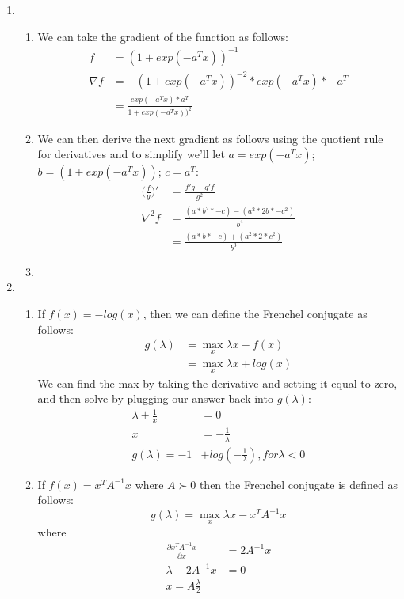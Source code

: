 \documentclass[11pt,a4paper]{article}
\begin{document}
\begin{enumerate}
			\item
			\begin{enumerate}
				\item We can take the gradient of the function as follows:
				\begin{align*}
				f &= (1+exp(-a^Tx))^{-1} \\
				\nabla f &= -(1+exp(-a^Tx))^{-2} * exp(-a^Tx) * -a^T \\
						 &= \frac{exp(-a^Tx) * a^T}{1+exp(-a^Tx))^{2}}
				\end{align*}
				\item We can then derive the next gradient as follows using the quotient rule for derivatives and to simplify we'll let $a = exp(-a^Tx)$; $b=(1+exp(-a^Tx))$; $c = a^T$:
				\begin{align*}
				\Big(\frac{f}{g}\Big)' &= \frac{f'g - g'f}{g^2} \\
				\nabla^2 f &= \frac{(a * b^2 * -c) - (a^2 * 2b * -c^2)}{b^4} \\
				&= \frac{(a * b * -c) + (a^2 * 2 * c^2)}{b^3}
				\end{align*}
				\item 
			\end{enumerate}
			\item
			\begin{enumerate}
				\item If $f(x)=-log(x)$, then we can define the Frenchel conjugate as follows:
				\begin{align*}
				g(\lambda) &= \max_x \lambda x - f(x) \\
				&= \max_x \lambda x + log(x)
				\end{align*}
				We can find the max by taking the derivative and setting it equal to zero, and then solve by plugging our answer back into $g(\lambda)$:
				\begin{align*}
					\lambda+\frac{1}{x} &= 0 \\
					x &= -\frac{1}{\lambda} \\
					g(\lambda) = -1 &+ log(-\frac{1}{\lambda}), for \lambda<0
				\end{align*}
				
				\item If $f(x) = x^T A^{-1}x$ where $A \succ 0$ then the Frenchel conjugate is defined as follows:
				$$g(\lambda) = \max_x \lambda x - x^T A^{-1}x$$ where
				\begin{align*}
				\frac{\partial x^T A^{-1}x}{\partial x} &= 2A^{-1}x \\
				\lambda - 2A^{-1}x &= 0 \\
				x = A\frac{\lambda}{2}
				\end{align*}
			\end{enumerate}
		

\end{enumerate}
\end{document}
